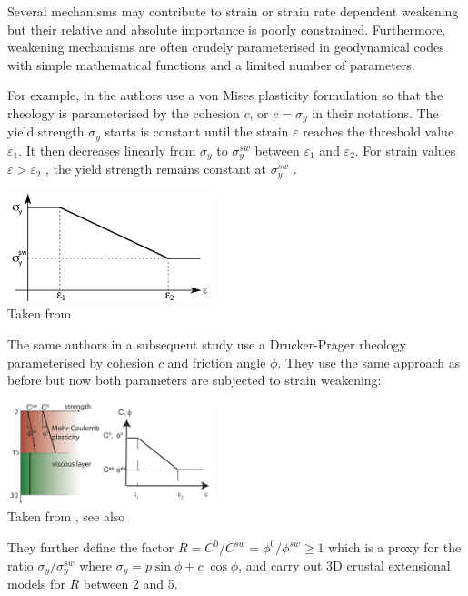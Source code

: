 Several mechanisms may contribute to strain or strain
rate dependent weakening but their relative and absolute
importance is poorly constrained. Furthermore, 
weakening mechanisms are often crudely parameterised in 
geodynamical codes with simple mathematical functions 
and a limited number of parameters. 

For example, in \cite{alht11} the authors use a von Mises plasticity formulation so that the 
rheology is parameterised by the cohesion $c$, or $c=\sigma_y$ in their notations. The
yield strength $\sigma_y$ starts is constant until the strain
$\varepsilon$ reaches the threshold value $\varepsilon_1$. It then decreases linearly
from $\sigma_y$ to $\sigma_{y}^{sw}$ between $\varepsilon_1$ and $\varepsilon_2$. 
For strain values $\varepsilon>\varepsilon_2$ , the yield strength remains constant 
at $\sigma_y^{sw}$ .

\begin{center}
\includegraphics[width=6cm]{images/strainweakening/alht11}\\
{\tiny Taken from \cite{alht11}}
\end{center}

The same authors in a subsequent study use a Drucker-Prager rheology parameterised by 
cohesion $c$ and friction angle $\phi$. They use the same approach as before but now 
both parameters are subjected to strain weakening: 

\begin{center}
\includegraphics[width=6cm]{images/strainweakening/alht12}\\
{\tiny Taken from \cite{alht12}, see also \cite{thie11}}
\end{center}

They further define the factor $R=C^0/C^{sw}=\phi^0/\phi^{sw}\geq 1$ which is a proxy
for the ratio $\sigma_y/\sigma_y^{sw}$ where $\sigma_y=p \sin\phi + c \; \cos \phi$, 
and carry out 3D crustal extensional models for $R$ between 2 and 5. 


